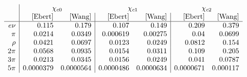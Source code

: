 $$
\begin{array}{r|rr|rr|rr}
  &\multicolumn{2}{c}{\chi_{c0}} & \multicolumn{2}{c}{\chi_{c1}} & \multicolumn{2}{c}{\chi_{c2}} \\
   & \text{[Ebert]} & \text{[Wang]} & \text{[Ebert]} & \text{[Wang]} & \text{[Ebert]} & \text{[Wang]} \\
\hline
 e\nu & 0.115 & 0.179 & 0.107 & 0.149 & 0.209 & 0.379 \\
 \pi & 0.0214 & 0.0349 & 0.000619 & 0.00275 & 0.04 & 0.0699 \\
 \rho & 0.0421 & 0.0697 & 0.0123 & 0.0249 & 0.0812 & 0.154 \\
 2\pi & 0.0568 & 0.0935 & 0.0154 & 0.0311 & 0.109 & 0.205 \\
 3\pi & 0.0213 & 0.0345 & 0.0156 & 0.0249 & 0.041 & 0.0787 \\
 5\pi & 0.0000379 & 0.0000564 & 0.0000486 & 0.0000634 & 0.0000671 & 0.000117 \\
\end{array}
$$